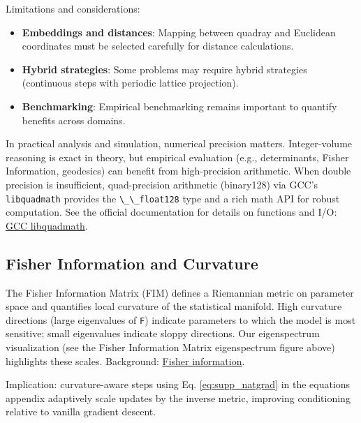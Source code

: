 \documentclass[
  10pt,
]{article}
\newcommand{\passthrough}[1]{#1}
\providecommand{\tightlist}{%
  \setlength{\itemsep}{0pt}\setlength{\parskip}{0pt}}
\begin{document}
Limitations and considerations:

\begin{itemize}
\tightlist
\item
  \textbf{Embeddings and distances}: Mapping between quadray and
  Euclidean coordinates must be selected carefully for distance
  calculations.
\item
  \textbf{Hybrid strategies}: Some problems may require hybrid
  strategies (continuous steps with periodic lattice projection).
\item
  \textbf{Benchmarking}: Empirical benchmarking remains important to
  quantify benefits across domains.
\end{itemize}

In practical analysis and simulation, numerical precision matters.
Integer-volume reasoning is exact in theory, but empirical evaluation
(e.g., determinants, Fisher Information, geodesics) can benefit from
high-precision arithmetic. When double precision is insufficient,
quad-precision arithmetic (binary128) via GCC's
\passthrough{\lstinline!libquadmath!} provides the
\passthrough{\lstinline!\_\_float128!} type and a rich math API for
robust computation. See the official documentation for details on
functions and I/O:
\href{https://gcc.gnu.org/onlinedocs/libquadmath/index.html}{GCC
libquadmath}.

\hypertarget{fisher-information-and-curvature}{%
\subsection{Fisher Information and
Curvature}\label{fisher-information-and-curvature}}

The Fisher Information Matrix (FIM) defines a Riemannian metric on
parameter space and quantifies local curvature of the statistical
manifold. High curvature directions (large eigenvalues of
\passthrough{\lstinline!F!}) indicate parameters to which the model is
most sensitive; small eigenvalues indicate sloppy directions. Our
eigenspectrum visualization (see the Fisher Information Matrix
eigenspectrum figure above) highlights these scales. Background:
\href{https://en.wikipedia.org/wiki/Fisher_information}{Fisher
information}.

Implication: curvature-aware steps using Eq. \eqref{eq:supp_natgrad} in
the equations appendix adaptively scale updates by the inverse metric,
improving conditioning relative to vanilla gradient descent.
\end{document}
